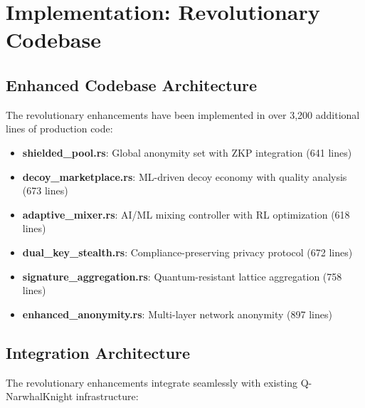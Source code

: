 \documentclass[12pt,a4paper]{article}
\begin{document}
\section{Implementation: Revolutionary Codebase}

\subsection{Enhanced Codebase Architecture}

The revolutionary enhancements have been implemented in over 3,200 additional lines of production code:

\begin{itemize}
\item \textbf{shielded\_pool.rs}: Global anonymity set with ZKP integration (641 lines)
\item \textbf{decoy\_marketplace.rs}: ML-driven decoy economy with quality analysis (673 lines)
\item \textbf{adaptive\_mixer.rs}: AI/ML mixing controller with RL optimization (618 lines)
\item \textbf{dual\_key\_stealth.rs}: Compliance-preserving privacy protocol (672 lines)
\item \textbf{signature\_aggregation.rs}: Quantum-resistant lattice aggregation (758 lines)
\item \textbf{enhanced\_anonymity.rs}: Multi-layer network anonymity (897 lines)
\end{itemize}

\subsection{Integration Architecture}

The revolutionary enhancements integrate seamlessly with existing Q-NarwhalKnight infrastructure:
\end{document}
